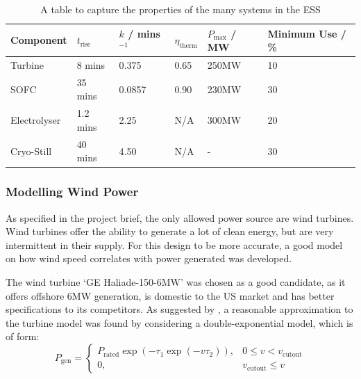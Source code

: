 %
    \begin{table}[ht]
            \centering
        \begin{tabular}{||l l l l l l||}
                \hline
                Component & $t_{\text{rise}}$ & $k$ / mins$^{-1}$ & $\eta_{\text{therm}}$ & $P_{\text{max}}$ / MW& Minimum Use / \%\\
                \hline
                \hline
                Turbine& 8 mins & 0.375 & 0.65 & 250MW & 10\\
                \hline
                SOFC& 35 mins & 0.0857 & 0.90 & 230MW & 30\\
                \hline
                Electrolyser& 1.2 mins & 2.25 & N/A & 300MW & 20\\
                \hline
                Cryo-Still & 40 mins & 4.50 & N/A & - & 30\\
                \hline
        \end{tabular}
        \caption{A table to capture the properties of the many systems in the ESS}
    \label{tbl:powercomp}
    \end{table}

\subsubsection{Modelling Wind Power}

As specified in the project brief, the only allowed power source are wind turbines.
Wind turbines offer the ability to generate a lot of clean energy, but are very intermittent in their supply.
For this design to be more accurate, a good model on how wind speed correlates with power generated was developed.

The wind turbine `GE Haliade-150-6MW' was chosen as a good candidate, as it offers offshore 6MW generation, is domestic to the US market and has better specifications to its competitors.
As suggested by \cite{power:wturbine}, a reasonable approximation to the turbine model was found by considering a double-exponential model, which is of form:
%
\begin{equation}
        \label{eqn:wturbexm}
        P_{\text{gen}} =
        \begin{cases}
                P_{\text{rated}} \exp ( -\tau_1 \exp (-v \tau_2)),& 0 \leq v < v_{\text{cutout}}\\
                0,& v_{\text{cutout}} \leq v
        \end{cases}
\end{equation}

